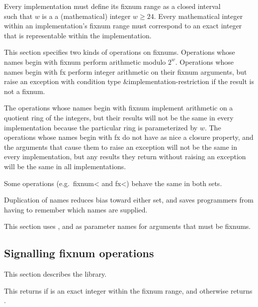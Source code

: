 Every implementation must define its fixnum range as a closed
interval
%
\begin{displaymath}
[-2^{w-1}, 2^{w-1} - 1]
\end{displaymath}
%
such that $w$ is a a (mathematical) integer $w \geq 24$.  Every
mathematical integer within an implementation's fixnum range must
correspond to an exact integer that is representable within the
implementation.

This section specifies two kinds of operations on fixnums.  Operations
whose names begin with {\cf fixnum} perform arithmetic modulo
$2^{w}$.  Operations whose names begin with {\cf fx}
perform integer arithmetic on their fixnum arguments, but raise an
exception with condition type {\cf\&implementation-restriction} 
if the result is not a fixnum.

\begin{rationale}
The operations whose names begin with {\cf fixnum}
implement arithmetic on a quotient ring of the integers,
but their results will not be the same in every implementation
because the particular ring is parameterized by $w$.
The operations whose names begin with {\cf fx} do
not have as nice a closure property, and the arguments that
cause them to raise an exception will not be the same in every
implementation, but any results they return without
raising an exception will be the same in all implementations.
\end{rationale}

Some operations (e.g.\ {\cf fixnum<} and {\cf fx<}) behave the same in
both sets.

\begin{rationale}
Duplication of names reduces bias toward either set,
and saves programmers from having to remember which
names are supplied.
\end{rationale}

This section uses ,  and  as parameter
names for arguments that must be fixnums.

\subsection{Signalling fixnum operations}

This section describes the  library.

\begin{entry}{%
}

This returns \schtrue{} if  is an exact
integer within the fixnum range, and
otherwise returns \schfalse{}.
\end{entry}

